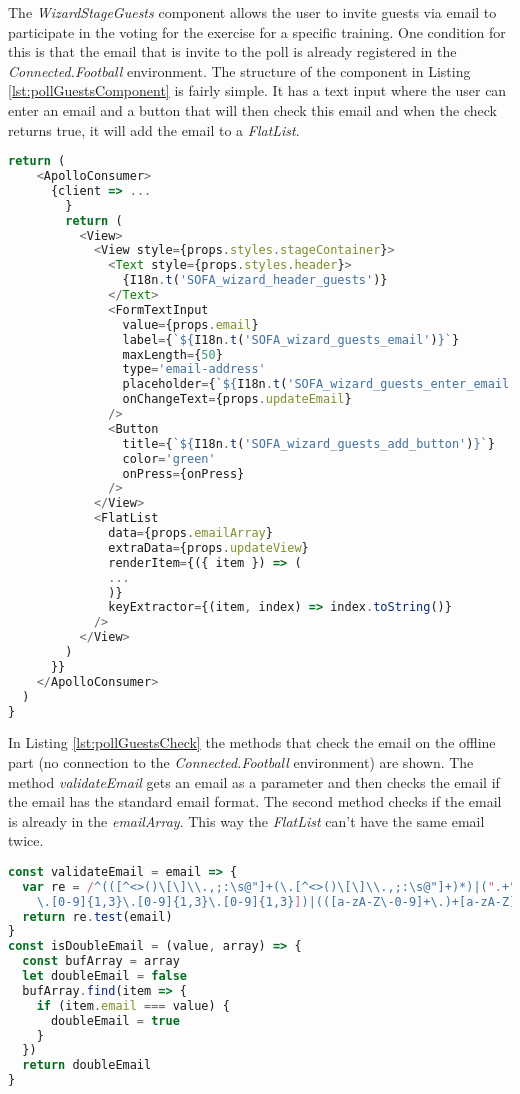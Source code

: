 The \textit{WizardStageGuests} component allows the user to invite guests via email to participate in the voting for the exercise for a specific training. One condition for this is that the email that is invite to the poll is already registered in the \textit{Connected.Football} environment. 
\newline
The structure of the component in Listing \ref{lst:pollGuestsComponent} is fairly simple. It has a text input where the user can enter an email and a button that will then check this email and when the check returns true, it will add the email to a \textit{FlatList}. 
\begin{lstlisting}[language=javascript, caption=Simplified Guest Component, label=lst:pollGuestsComponent]
return (
    <ApolloConsumer>
      {client => ...
        }
        return (
          <View>
            <View style={props.styles.stageContainer}>
              <Text style={props.styles.header}>
                {I18n.t('SOFA_wizard_header_guests')}
              </Text>
              <FormTextInput
                value={props.email}
                label={`${I18n.t('SOFA_wizard_guests_email')}`}
                maxLength={50}
                type='email-address'
                placeholder={`${I18n.t('SOFA_wizard_guests_enter_email')}`}
                onChangeText={props.updateEmail}
              />
              <Button
                title={`${I18n.t('SOFA_wizard_guests_add_button')}`}
                color='green'
                onPress={onPress}
              />
            </View>
            <FlatList
              data={props.emailArray}
              extraData={props.updateView}
              renderItem={({ item }) => (
              ...
              )}
              keyExtractor={(item, index) => index.toString()}
            />
          </View>
        )
      }}
    </ApolloConsumer>
  )
}
\end{lstlisting}

In Listing \ref{lst:pollGuestsCheck} the methods that check the email on the offline part (no connection to the \textit{Connected.Football} environment) are shown. The method \textit{validateEmail} gets an email as a parameter and then checks the email if the email has the standard email format. The second method checks if the email is already in the \textit{emailArray}. This way the \textit{FlatList} can't have the same email twice.

\begin{lstlisting}[language=javascript, caption=Check E-Mail Methods, label=lst:pollGuestsCheck]
const validateEmail = email => {
  var re = /^(([^<>()\[\]\\.,;:\s@"]+(\.[^<>()\[\]\\.,;:\s@"]+)*)|(".+"))@((\[[0-9]{1,3}
    \.[0-9]{1,3}\.[0-9]{1,3}\.[0-9]{1,3}])|(([a-zA-Z\-0-9]+\.)+[a-zA-Z]{2,}))$/
  return re.test(email)
}
const isDoubleEmail = (value, array) => {
  const bufArray = array
  let doubleEmail = false
  bufArray.find(item => {
    if (item.email === value) {
      doubleEmail = true
    }
  })
  return doubleEmail
}
\end{lstlisting}

